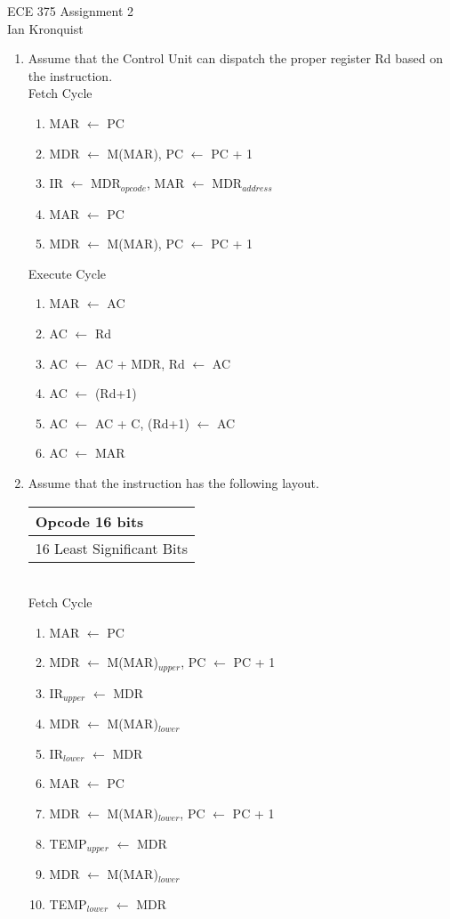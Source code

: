 \documentclass[12pt,letterpaper]{article}
\begin{document}
\begin{flushright}
{\large
ECE 375 Assignment 2\\
Ian Kronquist
}
\end{flushright}

\bigskip

\begin{enumerate}
    \item Assume that the Control Unit can dispatch the proper register Rd
    based on the instruction.\\
    Fetch Cycle
    \begin{enumerate}[i]
        \item MAR $\leftarrow$ PC
        \item MDR $\leftarrow$ M(MAR), PC $\leftarrow$ PC + 1
        \item IR $\leftarrow$ MDR$_{opcode}$, MAR $\leftarrow$ MDR$_{address}$
        \item MAR $\leftarrow$ PC
        \item MDR $\leftarrow$ M(MAR), PC $\leftarrow$ PC + 1
    \end{enumerate}

    Execute Cycle
    \begin{enumerate}[i]
        \item MAR $\leftarrow$ AC
        \item AC $\leftarrow$ Rd
        \item AC $\leftarrow$ AC + MDR, Rd $\leftarrow$ AC
        \item AC  $\leftarrow$ (Rd+1)
        \item AC $\leftarrow$ AC + C, (Rd+1) $\leftarrow$ AC
        \item AC $\leftarrow$ MAR
    \end{enumerate}
    \item Assume that the instruction has the following layout.\\
    \begin{tabular}{l}
        Opcode 16 bits\\
        \hline
        16 Least Significant Bits
    \end{tabular}\\
    Fetch Cycle
    \begin{enumerate}[i]
        \item MAR $\leftarrow$ PC
        \item MDR $\leftarrow$ M(MAR)$_{upper}$, PC $\leftarrow$ PC + 1
        \item IR$_{upper}$ $\leftarrow$ MDR
        \item MDR $\leftarrow$ M(MAR)$_{lower}$
        \item IR$_{lower}$ $\leftarrow$ MDR
        \item MAR $\leftarrow$ PC
        \item MDR $\leftarrow$ M(MAR)$_{lower}$, PC $\leftarrow$ PC + 1
        \item TEMP$_{upper}$ $\leftarrow$ MDR
        \item MDR $\leftarrow$ M(MAR)$_{lower}$
        \item TEMP$_{lower}$ $\leftarrow$ MDR
    \end{enumerate}


\end{enumerate}
\end{document}
